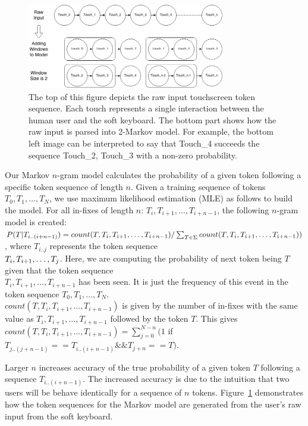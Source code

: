 \documentclass{acm_proc_article-sp}
\begin{document}
\begin{figure}
\centering
\includegraphics[width=3.4in]{figures/markov_model_building.png}
\caption{The top of this figure depicts the raw input touchscreen token sequence. Each touch represents a single interaction between the human user and the soft keyboard. The bottom part shows how the raw input is parsed into 2-Markov model. For example, the bottom left image can be interpreted to say that Touch\_4 succeeds the sequence Touch\_2, Touch\_3 with a non-zero probability.}
\label{fig:markov_model_building}
\end{figure}

Our Markov $n$-gram model calculates the probability of a given token following a specific 
token sequence of length $n$. Given a training sequence of tokens $T_0, T_1, \dots , T_N$,
we use maximum likelihood estimation (MLE) as follows to build the model. For all in-fixes of
length $n$: $T_i, T_{i+1}, \dots , T_{i+n-1}$, the following $n$-gram model is created:
$P(T | T_{i..(i+n-1)}) =  count(T, T_i, T_{i+1}, \dots , T_{i+n-1})/\sum_{T \in \Sigma} count(
T, T_i, T_{i+1}, \dots , \\T_{i+n-1}))$, where $T_{i..j}$ represents the
token sequence \\
$T_i, T_{i+\\1}, \dots, T_j$. Here, we are computing the probability of next token being $T$
given that the token sequence \\
$T_i, T_{i+1}, \dots , T_{i+n-1}$ has been seen. It is just the
frequency of this event in the token sequence $T_0, T_1, \dots , T_N$. \\
$count(T, T_i, T_{i+1}, \dots , T_{i+n-1})$ is given by the number of in-fixes with the same value as
$T_i, T_{i+1}, \dots , T_{i+n-1}$ followed by the token $T$. This gives 
$count(T, T_i, T_{i+1}, \dots , T_{i+n-1}) = \sum_{j=0}^{N-n}(1$ if $T_{j..(j+n-1)} == T_{i..(i+n-1)} \&\&
T_{j+n} == T)$.

Larger $n$ increases accuracy of the true probability of a given token $T$ following
a sequence $T_{i..(i+n-1)}$. The increased accuracy is due to the intuition that 
two users will be behave identically for  a sequence of $n$ tokens.
Figure~\ref{fig:markov_model_building} demonstrates how the token sequences for the Markov model are generated from the user's raw input from the soft keyboard.
\end{document}
